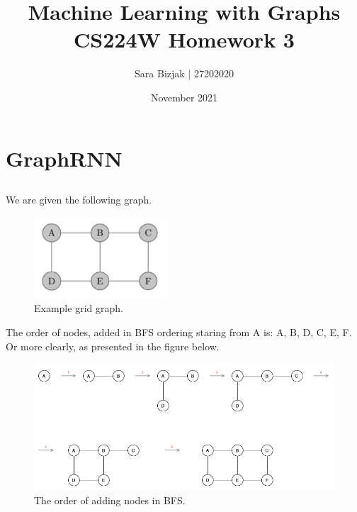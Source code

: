 \documentclass[a4paper,11pt]{article}
\title{Machine Learning with Graphs \\
\textbf{CS224W Homework 3} }
\author{Sara Bizjak  |  27202020}
\date{November 2021}
\begin{document}
\maketitle


\section{GraphRNN}


\subsection{}
We are given the following graph.
\begin{figure}[ht!]
    \centering
    \includegraphics[width=50mm]{Figures/1.png}
    \caption{Example grid graph.}
\end{figure}

\noindent
The order of nodes, added in BFS ordering staring from A is: A, B, D, C, E, F.
Or more clearly, as presented in the figure below.
\begin{figure}[ht!]
    \centering
    \includegraphics[width=170mm]{Figures/1_1.png}
    \caption{The order of adding nodes in BFS.}
\end{figure}
\end{document}
